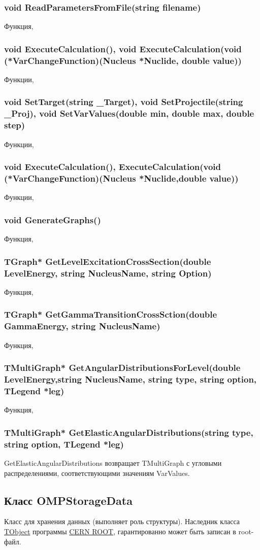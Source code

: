 \documentclass[a4paper,12pt]{extarticle}
\begin{document}
\subsubsection{void ReadParametersFromFile(string filename)}
Функция, 
\subsubsection{void ExecuteCalculation(), void ExecuteCalculation(void (*VarChangeFunction)(Nucleus *Nuclide, double value))}
Функции, 
\subsubsection{void SetTarget(string _Target), void SetProjectile(string _Proj), void SetVarValues(double min, double max, double step)}
Функции, 
\subsubsection{void ExecuteCalculation(), ExecuteCalculation(void (*VarChangeFunction)(Nucleus *Nuclide,double value))}
Функции, 
\subsubsection{void GenerateGraphs()}
Функция, 
\subsubsection{TGraph* GetLevelExcitationCrossSection(double LevelEnergy, string NucleusName, string Option)}
Функция, 
\subsubsection{TGraph* GetGammaTransitionCrossSction(double GammaEnergy, string NucleusName)}
Функция, 
\subsubsection{TMultiGraph* GetAngularDistributionsForLevel(double LevelEnergy,string NucleusName, string type, string option, TLegend *leg)}
Функция, 
\subsubsection{TMultiGraph* GetElasticAngularDistributions(string type, string option, TLegend *leg)}
GetElasticAngularDistributions возвращает TMultiGraph с угловыми распределениями, соответствующими значениям VarValues.
\subsection{Класс OMPStorageData}
Класс для хранения данных (выполняет роль структуры). Наследник класса \href{https://root.cern/doc/master/classTObject.html}{TObject} программы \href{https://root.cern}{CERN ROOT}, гарантированно может быть записан в root-файл. 
\end{document}
